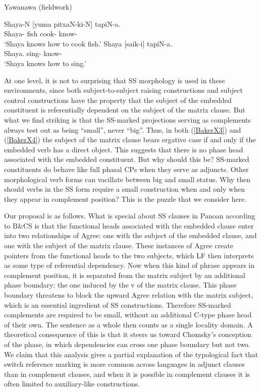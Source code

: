 \documentclass[output=paper]{langscibook}
\begin{document}
\begin{exe}
    \ex Yawanawa (fieldwork) \label{BakerX4}
	    \begin{xlist}
			\ex \label{BakerX4a}
			\gll Shaya-N [yuma pitxaN-ki-N] tapiN-a.\\
			     Shaya- fish cook- know-\\
			    \glt `Shaya knows how to cook fish.'
			\ex \label{BakerX4b}
			\gll Shaya [saik-i] tapiN-a.\\
    			 Shaya. sing- know-\\
			    \glt `Shaya knows how to sing.'
		\end{xlist}
\end{exe}

At one level, it is not to surprising that SS morphology is used in these environments, since both subject-to-subject raising constructions and subject control constructions have the property that the subject of the embedded constituent is referentially dependent on the subject of the matrix clause. But what we find striking is that the SS-marked projections serving as complements always test out as being “small”, never “big”. Thus, in both (\ref{BakerX3}) and (\ref{BakerX4}) the subject of the matrix clause bears ergative case if and only if the embedded verb has a direct object. This suggests that there is no phase head associated with the embedded constituent. But why should this be? SS-marked constituents do behave like full phasal CPs when they serve as adjuncts. Other morphological verb forms can vacillate between big and small status. Why then should verbs in the SS form require a small construction when and only when they appear in complement position? This is the puzzle that we consider here.

Our proposal is as follows. What is special about SS clauses in Panoan according to B\&CS is that the functional heads associated with the embedded clause enter into two relationships of Agree: one with the subject of the embedded clause, and one with the subject of the matrix clause. These instances of Agree create pointers from the functional heads to the two subjects, which LF then interprets as some type of referential dependency. Now when this kind of phrase appears in complement position, it is separated from the matrix subject by an additional phase boundary: the one induced by the v of the matrix clause. This phase boundary threatens to block the upward Agree relation with the matrix subject, which is an essential ingredient of SS constructions. Therefore SS-marked complements are required to be small, without an additional C-type phase head of their own. The sentence as a whole then counts as a single locality domain. A theoretical consequence of this is that it steers us toward Chomsky’s \citeyearpar{chomsky2001derivation} conception of the phase, in which dependencies can cross one phase boundary but not two. We claim that this analysis gives a partial explanation of the typological fact that switch reference marking is more common across languages in adjunct clauses than in complement clauses, and when it is possible in complement clauses it is often limited to auxiliary-like constructions.
\end{document}
